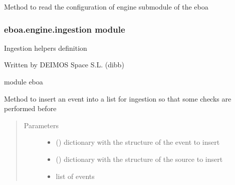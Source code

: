 
\begin{fulllineitems}
\label{\detokenize{eboa.engine:eboa.engine.functions.read_configuration}}
Method to read the configuration of engine submodule of the eboa

\end{fulllineitems}



\subsubsection{eboa.engine.ingestion module}
\label{\detokenize{eboa.engine:module-eboa.engine.ingestion}}\label{\detokenize{eboa.engine:eboa-engine-ingestion-module}}
Ingestion helpers definition

Written by DEIMOS Space S.L. (dibb)

module eboa

\begin{fulllineitems}
\label{\detokenize{eboa.engine:eboa.engine.ingestion.insert_event_for_ingestion}}
Method to insert an event into a list for ingestion so that some checks are performed before
\begin{quote}\begin{description}
\item[{Parameters}] \leavevmode\begin{itemize}
\item {} 
 () \textendash{} dictionary with the structure of the event to insert

\item {} 
 () \textendash{} dictionary with the structure of the source to insert

\item {} 
 \textendash{} list of events

\end{itemize}

\end{description}\end{quote}

\end{fulllineitems}



